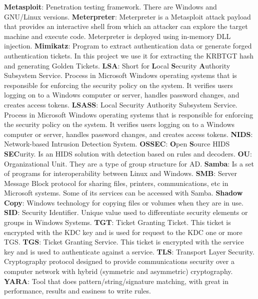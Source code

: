 \linej
\linej
\textbf{Metasploit}: Penetration testing framework. There are Windows and GNU/Linux versions.
\linej
\linej
\textbf{Meterpreter}: Meterpreter is a Metasploit attack payload that provides an interactive shell from which an attacker can explore the target machine and execute code. Meterpreter is deployed using in-memory DLL injection.
\linej
\linej
\textbf{Mimikatz}: Program to extract authentication data or generate forged authentication tickets. In this project we use it for extracting the KRBTGT hash and generating Golden Tickets.
\linej
\linej
\textbf{LSA}: Short for \textbf{L}ocal \textbf{S}ecurity \textbf{A}uthority Subsystem Service. Process in Microsoft Windows operating systems that is responsible for enforcing the security policy on the system. It verifies users logging on to a Windows computer or server, handles password changes, and creates access tokens.
\linej
\linej
\textbf{LSASS}: Local Security Authority Subsystem Service. Process in Microsoft Windows operating systems that is responsible for enforcing the security policy on the system. It verifies users logging on to a Windows computer or server, handles password changes, and creates access tokens.
\linej
\linej
\textbf{NIDS}: Network-based Intrusion Detection System.
\linej
\linej
\textbf{OSSEC}: \textbf{O}pen \textbf{S}ource HIDS \textbf{SEC}urity. Is an HIDS solution with detection based on rules and decoders.
\linej
\linej
\textbf{OU}: Organizational Unit. They are a type of group structure for AD.
\linej
\linej
\textbf{Samba}: Is a set of programs for interoperability between Linux and Windows.
\linej
\linej
\textbf{SMB}: Server Message Block protocol for sharing files, printers, communications, etc in Microsoft systems. Some of its services can be accessed with Samba.
\linej
\linej
\textbf{Shadow Copy}: Windows technology for copying files or volumes when they are in use.
\linej
\linej
\textbf{SID}: Security Identifier. Unique value used to differentiate security elements or groups in Windows Systems.
\linej
\linej
\textbf{TGT}: Ticket Granting Ticket. This ticket is encrypted with the KDC key and is used for request to the KDC one or more TGS.
\linej
\linej
\textbf{TGS}: Ticket Granting Service. This ticket is encrypted with the service key and is used to authenticate against a service.
\linej
\linej
\textbf{TLS}: Transport Layer Security. Cryptography protocol designed to provide communications security over a computer network with hybrid (symmetric and asymmetric) cryptography.
\linej
\linej
\textbf{YARA}: Tool that does pattern/string/signature matching, with great in performance, results and easiness to write rules.
\linej
\linej
